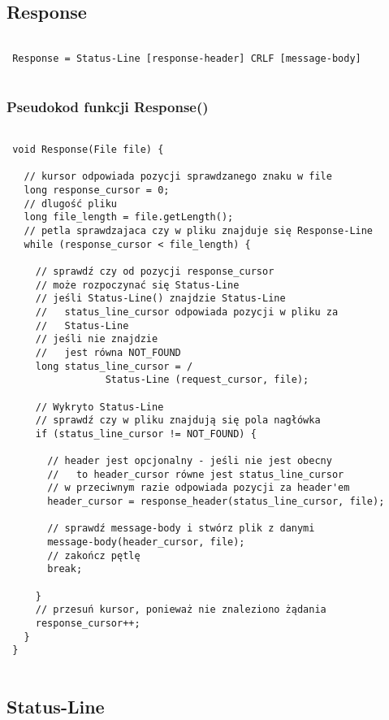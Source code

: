 \documentclass[a4paper,11pt]{report}
\begin{document}
\subsection{Response}

\begin{lstlisting}

 Response = Status-Line [response-header] CRLF [message-body]
 
\end{lstlisting}

\subsubsection{Pseudokod funkcji Response()}

\begin{lstlisting}

 void Response(File file) {
   
   // kursor odpowiada pozycji sprawdzanego znaku w file
   long response_cursor = 0;
   // dlugość pliku
   long file_length = file.getLength();
   // petla sprawdzajaca czy w pliku znajduje się Response-Line
   while (response_cursor < file_length) {
   
     // sprawdź czy od pozycji response_cursor
     // może rozpoczynać się Status-Line
     // jeśli Status-Line() znajdzie Status-Line
     //   status_line_cursor odpowiada pozycji w pliku za
     //   Status-Line 
     // jeśli nie znajdzie
     //   jest równa NOT_FOUND   
     long status_line_cursor = /
                 Status-Line (request_cursor, file);
         
     // Wykryto Status-Line
     // sprawdź czy w pliku znajdują się pola nagłówka
     if (status_line_cursor != NOT_FOUND) {
             
       // header jest opcjonalny - jeśli nie jest obecny
       //   to header_cursor równe jest status_line_cursor
       // w przeciwnym razie odpowiada pozycji za header'em
       header_cursor = response_header(status_line_cursor, file);
             
       // sprawdź message-body i stwórz plik z danymi        
       message-body(header_cursor, file);
       // zakończ pętlę
       break;
       
     }
     // przesuń kursor, ponieważ nie znaleziono żądania
     response_cursor++; 
   }
 }
 
\end{lstlisting}

\subsection{Status-Line}
\end{document}
